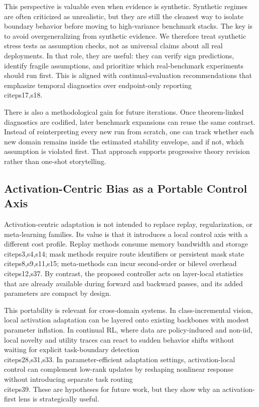 \documentclass{article} %
\begin{document}
This perspective is valuable even when evidence is synthetic. Synthetic regimes are often criticized as unrealistic, but they are still the cleanest way to isolate boundary behavior before moving to high-variance benchmark stacks. The key is to avoid overgeneralizing from synthetic evidence. We therefore treat synthetic stress tests as assumption checks, not as universal claims about all real deployments. In that role, they are useful: they can verify sign predictions, identify fragile assumptions, and prioritize which real-benchmark experiments should run first. This is aligned with continual-evaluation recommendations that emphasize temporal diagnostics over endpoint-only reporting \\citep{s17,s18}.

There is also a methodological gain for future iterations. Once theorem-linked diagnostics are codified, later benchmark expansions can reuse the same contract. Instead of reinterpreting every new run from scratch, one can track whether each new domain remains inside the estimated stability envelope, and if not, which assumption is violated first. That approach supports progressive theory revision rather than one-shot storytelling.

\subsection{Activation-Centric Bias as a Portable Control Axis}
Activation-centric adaptation is not intended to replace replay, regularization, or meta-learning families. Its value is that it introduces a local control axis with a different cost profile. Replay methods consume memory bandwidth and storage \\citep{s3,s4,s14}; mask methods require route identifiers or persistent mask state \\citep{s8,s9,s11,s15}; meta-methods can incur second-order or bilevel overhead \\citep{s12,s37}. By contrast, the proposed controller acts on layer-local statistics that are already available during forward and backward passes, and its added parameters are compact by design.

This portability is relevant for cross-domain systems. In class-incremental vision, local activation adaptation can be layered onto existing backbones with modest parameter inflation. In continual RL, where data are policy-induced and non-iid, local novelty and utility traces can react to sudden behavior shifts without waiting for explicit task-boundary detection \\citep{s28,s31,s33}. In parameter-efficient adaptation settings, activation-local control can complement low-rank updates by reshaping nonlinear response without introducing separate task routing \\citep{s39}. These are hypotheses for future work, but they show why an activation-first lens is strategically useful.
\end{document}
